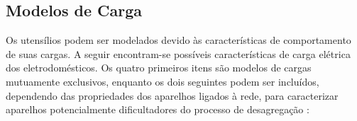 \subsection{Modelos de Carga}
\label{ssec:modelos_carga}

Os utensílios podem ser modelados devido às características de
comportamento de suas cargas. A seguir encontram-se possíveis
características de carga elétrica dos eletrodomésticos. Os quatro
primeiros itens são modelos de cargas mutuamente exclusivos, enquanto
os dois seguintes podem ser incluídos, dependendo das propriedades dos
aparelhos ligados à rede, para caracterizar aparelhos potencialmente
dificultadores do processo de desagregação \cite[com adaptações]{
nilm_hart_1992_8,nilm_baranski_genetic_base_2003_19,
nilm_zeifman_review_2011,nilm_zeifman_nonintrusive_2011,
nilm_apresentacao_review_2011,nilm_liang_pt2_2010_40}:

